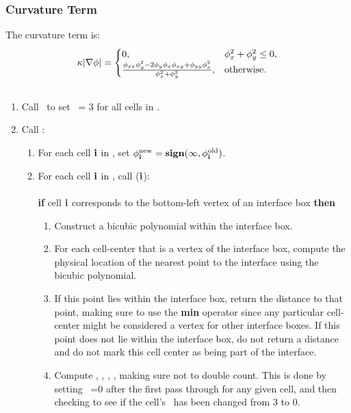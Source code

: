 \subsubsection{Curvature Term}
The curvature term is:
\begin{equation}
\kappa|\nabla\phi| = 
\begin{cases}
0, & \phi_x^2+\phi_y^2 \le 0, \\
\frac{\phi_{xx}\phi_y^2 - 2\phi_y\phi_x\phi_{xy} + \phi_{yy}\phi_x^2}{\phi_x^2 + \phi_y^2}, & {\rm otherwise}. \\
\end{cases}
\end{equation}
\subsection{\REINIT}
\begin{enumerate}
\item Call \RETYPIFY~to set \type~= 3 for all cells in \nband.
\item Call \FINDINTRFCE:
\begin{enumerate}
\item For each cell ${\bf i}$ in \nband, set $\phi_{\bf i}^{\rm new} = {\tt{\bf sign}}(\infty,\phi_{\bf i}^{\rm old})$.
\item For each cell ${\bf i}$ in \nband, call \UPDATEF(${\bf i}$):\\ \\
{\bf if} cell ${\bf i}$ corresponds to the bottom-left vertex of an interface box {\bf then}
\begin{enumerate}
\item Construct a bicubic polynomial within the interface box.
\item For each cell-center that is a vertex of the interface box, compute the physical location of the nearest point to the interface using the bicubic polynomial.
\item If this point lies within the interface box, return the distance to that point, making sure to use the {\bf min} operator since any particular cell-center might be considered a vertex for other interface boxes.  If this point does not lie within the interface box, do not return a distance and do not mark this cell center as being part of the interface.
\item Compute \intfacep, \intfacenump, \intfacen, \intfacenumn, making sure not to double count.  This is done by setting \type~=0 after the first pass through for any given cell, and then checking to see if the cell's \type~has been changed from 3 to 0.

\end{enumerate}
\end{enumerate}
\end{enumerate}
